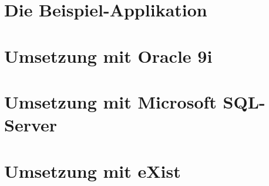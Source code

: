 \chapter{Die Beispiel-Applikation}


\chapter{Umsetzung mit Oracle 9i}


\chapter{Umsetzung mit Microsoft SQL-Server}


\chapter{Umsetzung mit eXist}
